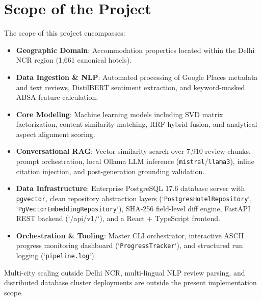 \section{Scope of the Project}
The scope of this project encompasses:
\begin{itemize}
    \item \textbf{Geographic Domain}: Accommodation properties located within the Delhi NCR region (1,661 canonical hotels).
    \item \textbf{Data Ingestion \& NLP}: Automated processing of Google Places metadata and text reviews, DistilBERT sentiment extraction, and keyword-masked ABSA feature calculation.
    \item \textbf{Core Modeling}: Machine learning models including SVD matrix factorization, content similarity matching, RRF hybrid fusion, and analytical aspect alignment scoring.
    \item \textbf{Conversational RAG}: Vector similarity search over 7,910 review chunks, prompt orchestration, local Ollama LLM inference (\texttt{mistral}/\texttt{llama3}), inline citation injection, and post-generation grounding validation.
    \item \textbf{Data Infrastructure}: Enterprise PostgreSQL 17.6 database server with \texttt{pgvector}, clean repository abstraction layers (`\texttt{PostgresHotelRepository}`, `\texttt{PgVectorEmbeddingRepository}`), SHA-256 field-level diff engine, FastAPI REST backend (`/api/v1/`), and a React + TypeScript frontend.
    \item \textbf{Orchestration \& Tooling}: Master CLI orchestrator, interactive ASCII progress monitoring dashboard (`\texttt{ProgressTracker}`), and structured run logging (`\texttt{pipeline.log}`).
\end{itemize}

Multi-city scaling outside Delhi NCR, multi-lingual NLP review parsing, and distributed database cluster deployments are outside the present implementation scope.

